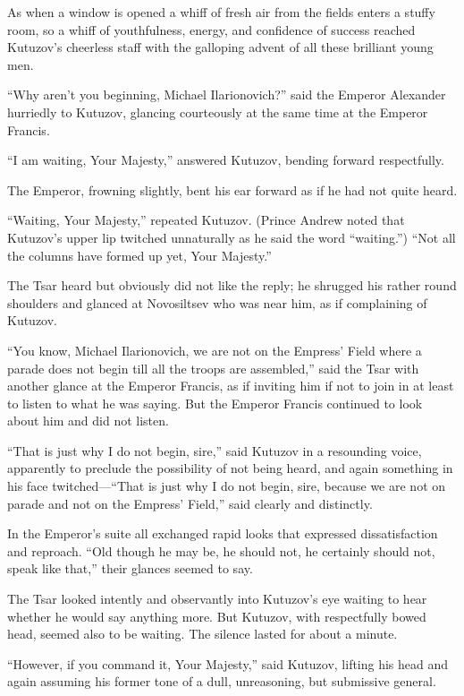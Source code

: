 As when a window is opened a whiff of fresh air from the fields
enters a stuffy room, so a whiff of youthfulness, energy, and
confidence of success reached Kutuzov's cheerless staff with the
galloping advent of all these brilliant young men.

``Why aren't you beginning, Michael Ilarionovich?'' said the
Emperor Alexander hurriedly to Kutuzov, glancing courteously at
the same time at the Emperor Francis.

``I am waiting, Your Majesty,'' answered Kutuzov, bending forward
respectfully.

The Emperor, frowning slightly, bent his ear forward as if he had
not quite heard.

``Waiting, Your Majesty,'' repeated Kutuzov. (Prince Andrew noted
that Kutuzov's upper lip twitched unnaturally as he said the word
``waiting.'')  ``Not all the columns have formed up yet, Your
Majesty.''

The Tsar heard but obviously did not like the reply; he shrugged
his rather round shoulders and glanced at Novosiltsev who was
near him, as if complaining of Kutuzov.

``You know, Michael Ilarionovich, we are not on the Empress'
Field where a parade does not begin till all the troops are
assembled,'' said the Tsar with another glance at the Emperor
Francis, as if inviting him if not to join in at least to listen
to what he was saying. But the Emperor Francis continued to look
about him and did not listen.

``That is just why I do not begin, sire,'' said Kutuzov in a
resounding voice, apparently to preclude the possibility of not
being heard, and again something in his face twitched---``That is
just why I do not begin, sire, because we are not on parade and
not on the Empress' Field,'' said clearly and distinctly.

In the Emperor's suite all exchanged rapid looks that expressed
dissatisfaction and reproach. ``Old though he may be, he should
not, he certainly should not, speak like that,'' their glances
seemed to say.

The Tsar looked intently and observantly into Kutuzov's eye
waiting to hear whether he would say anything more. But Kutuzov,
with respectfully bowed head, seemed also to be waiting. The
silence lasted for about a minute.

``However, if you command it, Your Majesty,'' said Kutuzov,
lifting his head and again assuming his former tone of a dull,
unreasoning, but submissive general.

